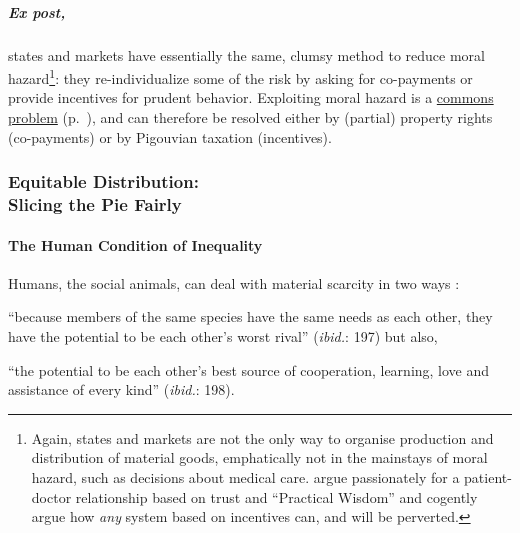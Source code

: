 \subparagraph{Ex post,} states and markets have essentially the same, clumsy method to reduce moral hazard\footnote{
	Again, states and markets are not the only way to organise production and distribution of material goods, emphatically not in the mainstays of moral hazard, such as decisions about medical care. \cite{Schwartz2010} argue passionately for a patient-doctor relationship based on trust and ``Practical Wisdom'' and cogently argue how \emph{any} system based on incentives can, and will be perverted.}: 
they re-individualize some of the risk by asking for co-payments or provide incentives for prudent behavior. Exploiting moral hazard is a \hyperref[sec:common-good]{commons problem} (p.~\pageref{sec:common-good}), and can therefore be resolved either by (partial) property rights (co-payments) or by Pigouvian taxation (incentives).

\subsubsection[Equitable Distribution]{Equitable Distribution: \\Slicing the Pie Fairly} \label{sec:distribution}


\paragraph{The Human Condition of Inequality}  \label{sec:human-condition-of-inequality} Humans, the social animals, can deal with material scarcity in two ways \citep{Pickett-2009-kx}: \begin{inparaenum}[1)]
	\item ``because members of the same species have the same needs as each other, they have the potential to be each other's worst rival'' (\emph{ibid.}: 197) but also,
	\item ``the potential to be each other's best source of cooperation, learning, love and assistance of every kind'' (\emph{ibid.}: 198). \end{inparaenum}

